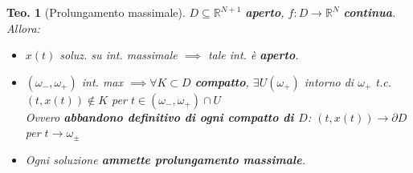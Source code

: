 \documentclass[a4paper,10pt]{article}
\newcommand{\re}{\mathbb{R}} %
\theoremstyle{indentdefinition}
\theoremstyle{indenttheorem}
\newtheorem{thm}{Teo.}
\theoremstyle{myremark}
\theoremstyle{indentgeneral}
\begin{document}
\begin{thm}[Prolungamento massimale]
    $D\subseteq \re^{N+1}$ \textbf{aperto}, $f:D\to\re^N$ \textbf{continua}. Allora:
    \begin{itemize}
        \item[a)] $x(t)$ soluz. su int. massimale $\implies$ tale int. è \textbf{aperto}.
        \item[b)] $(\omega_-,\omega_+)$ int. max  $\implies\forall K\subset D$ \textbf{compatto}, $\exists U(\omega_+)$ intorno di $\omega_+$ t.c. $(t,x(t))\not\in K$ per $t\in(\omega_-,\omega_+)\cap U$ \\
        Ovvero \textbf{abbandono definitivo di ogni compatto di $D$}: $(t,x(t))\to\partial D$ per $t\to\omega_\pm$
         \item[c)] Ogni soluzione \textbf{ammette prolungamento massimale}.
    \end{itemize}
\end{thm}
\end{document}
